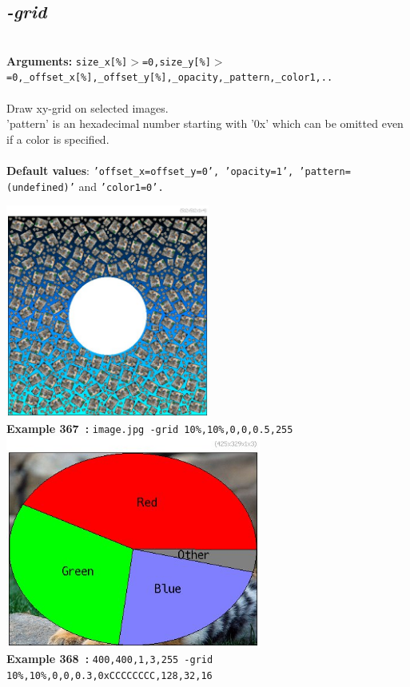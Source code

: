 \documentclass[a4paper,11pt,twoside]{book}
\begin{document}
\subsection{\emph{-grid} }\vspace*{-0.5em}
~\\\textbf{Arguments: } 
{\small \texttt{size\_x[\%]$>$=0,size\_y[\%]$>$=0,\_offset\_x[\%],\_offset\_y[\%],\_opacity,\_pattern,\_color1,..}}\\~\\
Draw xy-grid on selected images.
~\\'pattern' is an hexadecimal number starting with '0x' which can be omitted
even if a color is specified.
~\\~\\\textbf{Default values}: {\small \texttt{'offset\_x=offset\_y=0', 'opacity=1', 'pattern=(undefined)'} and \texttt{'color1=0'.}}
\begin{center}\includegraphics[keepaspectratio=true,height=7cm,width=\textwidth]{img/gmic_def367.jpg}\\
{\footnotesize \textbf{Example 367~:} \texttt{image.jpg -grid 10\%,10\%,0,0,0.5,255}}
\\\includegraphics[keepaspectratio=true,height=7cm,width=\textwidth]{img/gmic_def368.jpg}\\
{\footnotesize \textbf{Example 368~:} \texttt{400,400,1,3,255 -grid 10\%,10\%,0,0,0.3,0xCCCCCCCC,128,32,16}}
\end{center}
\end{document}
